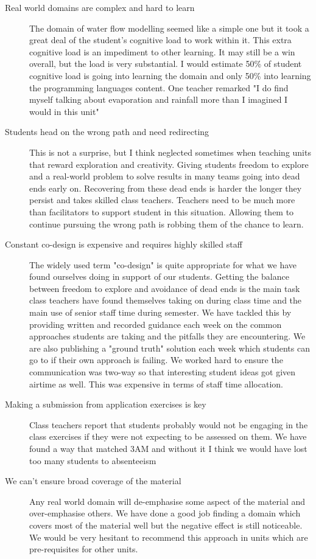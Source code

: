 \documentclass[twoside=false,DIV=14]{scrartcl}
\begin{document}
\begin{description}
\item[Real world domains are complex and hard to learn]  The domain of water flow modelling seemed like a simple one but it took a great deal of the student's cognitive load to work within it.  This extra cognitive load is an impediment to other learning.  It may still be a win overall, but the load is very substantial.  I would estimate 50\% of student cognitive load is going into learning the domain and only 50\% into learning the programming languages content.  One teacher remarked "I do find myself talking about evaporation and rainfall more than I imagined I would in this unit"
\item[Students head on the wrong path and need redirecting] This is not a surprise, but I think neglected sometimes when teaching units that reward exploration and creativity.  Giving students freedom to explore and a real-world problem to solve results in many teams going into dead ends early on.  Recovering from these dead ends is harder the longer they persist and takes skilled class teachers.  Teachers need to be much more than facilitators to support student in this situation.  Allowing them to continue pursuing the wrong path is robbing them of the chance to learn.
\item[Constant co-design is expensive and requires highly skilled staff] The widely used term "co-design" is quite appropriate for what we have found ourselves doing in support of our students.  Getting the balance between freedom to explore and avoidance of dead ends is the main task class teachers have found themselves taking on during class time and the main use of senior staff time during semester.  We have tackled this by providing written and recorded guidance each week on the common approaches students are taking and the pitfalls they are encountering.  We are also publishing a "ground truth" solution each week which students can go to if their own approach is failing.   We worked hard to ensure the communication was two-way so that interesting student ideas got given airtime as well.  This was expensive in terms of staff time allocation.
\item[Making a submission from application exercises is key]  Class teachers report that students probably would not be engaging in the class exercises if they were not expecting to be assessed on them.  We have found a  way that matched 3AM and without it I think we would have lost too many students to absenteeism 
\item[We can't ensure broad coverage of the material] Any real world domain will de-emphasise some aspect of the material and over-emphasise others.  We have done a good job finding a domain which covers most of the material well but the negative effect is still noticeable. We would be very hesitant to recommend this approach in units which are pre-requisites for other units.

\end{description}
\end{document}
